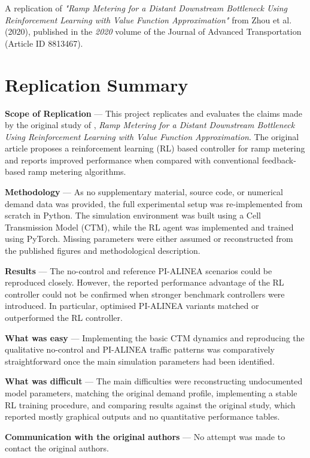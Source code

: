 
A replication of \textit{"Ramp Metering for a Distant Downstream
Bottleneck Using Reinforcement Learning with Value
Function Approximation"} from Zhou
et al. (2020), published in the \textit{2020} volume of the Journal of Advanced Transportation (Article ID 8813467).

\section*{Replication Summary}

\textbf{Scope of Replication} --- 
This project replicates and evaluates the claims made by the original study of
\cite{ORIGINAL_STUDY}, \emph{Ramp Metering for a Distant Downstream Bottleneck
Using Reinforcement Learning with Value Function Approximation}. The original
article proposes a reinforcement learning (RL) based controller for ramp metering
and reports improved performance when compared with conventional feedback-based ramp
metering algorithms.

\vspace{1em}

\textbf{Methodology} --- 
As no supplementary material, source code, or numerical demand data was provided,
the full experimental setup was re-implemented from scratch in Python. The
simulation environment was built using a Cell Transmission Model (CTM), while the
RL agent was implemented and trained using PyTorch. Missing parameters were either assumed or reconstructed from the published figures and
methodological description.


\vspace{1em}

\textbf{Results} --- 
The no-control and reference PI-ALINEA scenarios could be reproduced closely. However, the reported performance advantage of the
RL controller could not be confirmed when stronger benchmark controllers were
introduced. In particular, optimised PI-ALINEA variants matched or outperformed
the RL controller. 


\vspace{1em}

\textbf{What was easy} --- 
Implementing the basic CTM dynamics and reproducing the qualitative no-control
and PI-ALINEA traffic patterns was comparatively straightforward once the main
simulation parameters had been identified.

\vspace{1em}

\textbf{What was difficult} --- 
The main difficulties were reconstructing undocumented model parameters, matching
the original demand profile, implementing a stable RL training procedure, and
comparing results against the original study, which reported mostly graphical
outputs and no quantitative performance tables.

\vspace{1em}

\textbf{Communication with the original authors} --- 
No attempt was made to contact the original authors. 
